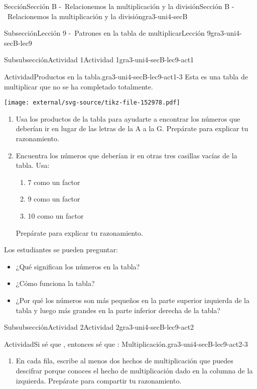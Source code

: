 \documentclass[twoside,10pt,]{article}
\begin{document}
\begin{sectionptx}{Sección}{Sección B -~Relacionemos la multiplicación y la división}{}{Sección B -~Relacionemos la multiplicación y la división}{}{}{gra3-uni4-secB}
\begin{subsectionptx}{Subsección}{Lección 9 -~Patrones en la tabla de multiplicar}{}{Lección 9}{}{}{gra3-uni4-secB-lec9}
\begin{subsubsectionptx}{Subsubsección}{Actividad 1}{}{Actividad 1}{}{}{gra3-uni4-secB-lec9-act1}
\begin{activity}{Actividad}{Productos en la tabla.}{gra3-uni4-secB-lec9-act1-3}%
Esta es una tabla de multiplicar que no se ha completado totalmente.%
\begin{image}{0}{1}{0}{}%
\texttt{[image: external/svg-source/tikz-file-152978.pdf]}
\end{image}%
%
\begin{enumerate}
\item{}Usa los productos de la tabla para ayudarte a encontrar los números que deberían ir en lugar de las letras de la A a la G. Prepárate para explicar tu razonamiento.%
\item{}Encuentra los números que deberían ir en otras tres casillas vacías de la tabla. Usa:%
%
\begin{enumerate}
\item{}7 como un factor%
\item{}9 como un factor%
\item{}10 como un factor%
\end{enumerate}
Prepárate para explicar tu razonamiento.%
\end{enumerate}
Los estudiantes se pueden preguntar:%
%
\begin{itemize}[label=\textbullet]
\item{}¿Qué significan los números en la tabla?%
\item{}¿Cómo funciona la tabla?%
\item{}¿Por qué los números son más pequeños en la parte superior izquierda de la tabla y luego más grandes en la parte inferior derecha de la tabla?%
\end{itemize}
\end{activity}%
\end{subsubsectionptx}
%
%
\typeout{************************************************}
\typeout{************************************************}
%
\begin{subsubsectionptx}{Subsubsección}{Actividad 2}{}{Actividad 2}{}{}{gra3-uni4-secB-lec9-act2}
\begin{activity}{Actividad}{Si sé que \textellipsis{}, entonces sé que \textellipsis{}: Multiplicación.}{gra3-uni4-secB-lec9-act2-3}%
%
\begin{enumerate}
\item{}En cada fila, escribe al menos dos hechos de multiplicación que puedes descifrar porque conoces el hecho de multiplicación dado en la columna de la izquierda. Prepárate para compartir tu razonamiento.%

\end{enumerate}
\end{activity}
\end{subsubsectionptx}
\end{subsectionptx}
\end{sectionptx}
\end{document}
